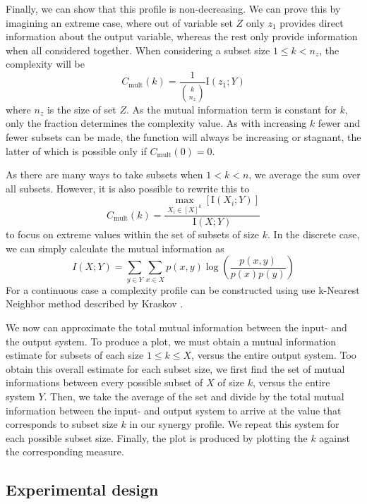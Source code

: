 \documentclass[../main.tex]{subfiles}
\begin{document}
Finally, we can show that this profile is non-decreasing.
We can prove this by imagining an extreme case, where out of variable set $Z$ only $z_1$ provides direct information about the output variable, whereas the rest only provide information when all considered together.
When considering a subset size $1 \le k < n_z $, the complexity will be
%
\begin{equation}
C_\mathrm{mult}(k) = \frac{1}{\binom{k}{n_z}} \mathrm{I}(z_1;Y)
\end{equation}
%
where $n_z$ is the size of set $Z$.
As the mutual information term is constant for $k$, only the fraction determines the complexity value.
As with increasing $k$ fewer and fewer subsets can be made, the function will always be increasing or stagnant, the latter of which is possible only if $C_\mathrm{mult}(0) = 0$.

As there are many ways to take subsets when $1 < k < n$, we average the sum over all subsets.
However, it is also possible to rewrite this to
%
\begin{equation}
C_\mathrm{mult}(k) = \frac{\max_{X_i \in [X]^k} [\mathrm{I}(X_i;Y)]}{\mathrm{I}(X;Y)}
\end{equation}
%
to focus on extreme values within the set of subsets of size $k$.
In the discrete case, we can simply calculate the mutual information as
%
\begin{equation}
	I(X;Y) = \sum_{y \in Y} \sum_{x \in X} p(x,y) \log (\frac{p(x,y)}{p(x)p(y)})
\end{equation}
%
For a continuous case a complexity profile can be constructed using use k-Nearest Neighbor method described by Kraskov \cite{kraskov2004estimating}.

We now can approximate the total mutual information between the input- and the output system.
To produce a plot, we must obtain a mutual information estimate for subsets of each size $1 \le k \le X$, versus the entire output system.
Too obtain this overall estimate for each subset size, we first find the set of mutual informations between every possible subset of $X$ of size $k$, versus the entire system $Y$.
Then, we take the average of the set and divide by the total mutual information between the input- and output system to arrive at the value that corresponds to subset size $k$ in our synergy profile.
We repeat this system for each possible subset size.
Finally, the plot is produced by plotting the $k$ against the corresponding measure.

\subsection{Experimental design}
\end{document}
